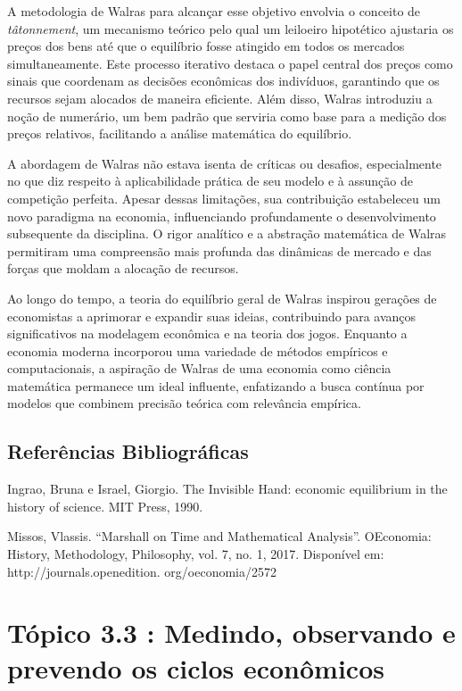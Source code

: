 \documentclass[12pt]{article}
\begin{document}
A metodologia de Walras para alcançar esse objetivo envolvia o conceito de \textit{tâtonnement}, um mecanismo teórico pelo qual um leiloeiro hipotético ajustaria os preços dos bens até que o equilíbrio fosse atingido em todos os mercados simultaneamente. Este processo iterativo destaca o papel central dos preços como sinais que coordenam as decisões econômicas dos indivíduos, garantindo que os recursos sejam alocados de maneira eficiente. Além disso, Walras introduziu a noção de numerário, um bem padrão que serviria como base para a medição dos preços relativos, facilitando a análise matemática do equilíbrio.

A abordagem de Walras não estava isenta de críticas ou desafios, especialmente no que diz respeito à aplicabilidade prática de seu modelo e à assunção de competição perfeita. Apesar dessas limitações, sua contribuição estabeleceu um novo paradigma na economia, influenciando profundamente o desenvolvimento subsequente da disciplina. O rigor analítico e a abstração matemática de Walras permitiram uma compreensão mais profunda das dinâmicas de mercado e das forças que moldam a alocação de recursos.

Ao longo do tempo, a teoria do equilíbrio geral de Walras inspirou gerações de economistas a aprimorar e expandir suas ideias, contribuindo para avanços significativos na modelagem econômica e na teoria dos jogos. Enquanto a economia moderna incorporou uma variedade de métodos empíricos e computacionais, a aspiração de Walras de uma economia como ciência matemática permanece um ideal influente, enfatizando a busca contínua por modelos que combinem precisão teórica com relevância empírica.

\subsection{\textbf{Referências Bibliográficas}}
Ingrao, Bruna e Israel, Giorgio. The Invisible Hand: economic equilibrium in the history of
science. MIT Press, 1990.

Missos, Vlassis. “Marshall on Time and Mathematical Analysis”. OEconomia: History,
Methodology, Philosophy, vol. 7, no. 1, 2017. Disponível em: http://journals.openedition.
org/oeconomia/2572



\section{\textbf{Tópico 3.3 : Medindo, observando e prevendo os ciclos econômicos}}
\end{document}
